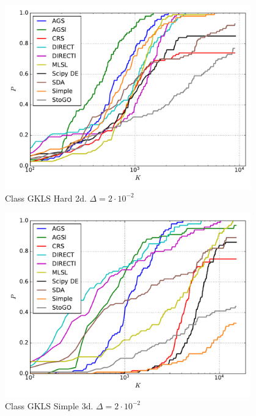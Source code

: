 \documentclass[a4paper]{article}
\begin{document}

\begin{figure}[H]
  \center
  \includegraphics[width=0.95\textwidth]{../experiments/gklsh2d/cmc.pdf}
  \caption{Class GKLS Hard 2d. $\Delta=2\cdot10^{-2}$}
\end{figure}


\begin{figure}[H]
  \center
  \includegraphics[width=0.95\textwidth]{../experiments/gklss3d/cmc.pdf}
  \caption{Class GKLS Simple 3d. $\Delta=2\cdot10^{-2}$}
\end{figure}

\end{document}
